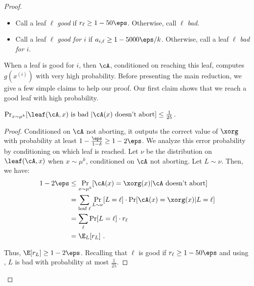 \documentclass{toc}
\begin{document}
\begin{proof}
\begin{definition}
    \begin{itemize}
    \item Call a leaf $\ell$ \emph{good} if $r_\ell \geq 1-50\eps$.
      Otherwise, call $\ell$ \emph{bad}.
    \item Call a leaf $\ell$ \emph{good for $i$} if
      $a_{i,\ell} \geq 1-5000\eps/k$.  Otherwise, call a leaf $\ell$
      \emph{bad for $i$}.
    \end{itemize}
  \end{definition}
  When a leaf is good for $i$, then $\cA$, conditioned on reaching
  this leaf, computes $g(x^{(i)})$ with very high probability.  Before
  presenting the main reduction, we give a few simple claims to help
  our proof.  Our first claim shows that we reach a good leaf with
  high probability.

  \begin{claim}\label{claim:leaf-good}
    $\Pr_{x \sim \mu^k}[\leaf(\cA,x) \text{ is bad } | \cA(x) \text{
      doesn't abort}] \leq \frac{1}{25}$.
  \end{claim}
  \begin{proof}
    Conditioned on $\cA$ not aborting, it outputs the correct value of
    $\xorg$ with probability at least
    $1-\frac{\eps}{1-\delta} \geq 1-2\eps$.  We analyze this error
    probability by conditioning on which leaf is reached.  Let $\nu$
    be the distribution on $\leaf(\cA,x)$ when $x \sim \mu^k$,
    conditioned on $\cA$ not aborting.  Let $L\sim \nu$.  Then, we
    have:
\begin{align*}
  1-2\eps &\leq \Pr_{x\sim \mu^k}[\cA(x) = \xorg(x) | \cA \text{ doesn't abort}] \\
  &= \sum_{\text{leaf }\ell } \Pr_{L \sim \nu}[L = \ell]\cdot \Pr[\cA(x) = \xorg(x) | L=\ell] \\
  &= \sum_\ell \Pr[L=\ell]\cdot r_\ell \\
  &= \E_L[r_L]\ .
\end{align*}

Thus, $\E[r_L] \geq 1-2\eps$.  Recalling that $\ell$ is good if
$r_\ell \geq 1-50\eps$ and using , $L$
is bad with probability at most $\frac{1}{25}$.
  \end{proof}


\end{proof}
\end{document}
